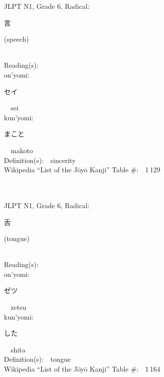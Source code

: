 \begin{multicols}{2}
{JLPT N1, Grade 6, Radical:\ \ {\begin{CJK}{UTF8}{min} 言 \end{CJK}} (speech) } \\
Reading(s):\ \ \\
{\hspace*{1em}}on'yomi:\ \ \\
{\hspace*{2em}}{\begin{CJK}{UTF8}{min} セイ \end{CJK}}\ \ sei\ \ \\
{\hspace*{1em}}kun'yomi:\ \ \\
{\hspace*{2em}}{\begin{CJK}{UTF8}{min} まこと \end{CJK}}\ \ makoto\ \ \\
Definition(s):\ \ sincerity \\
Wikipedia ``List of the J\=oy\=o Kanji'' Table \#:\ \ 1\,129 \\
\ \ \\
{\fontsize{34pt}{40pt}  }\ \ \\  %
{JLPT N1, Grade 6, Radical:\ \ {\begin{CJK}{UTF8}{min} 舌 \end{CJK}} (tongue) } \\
Reading(s):\ \ \\
{\hspace*{1em}}on'yomi:\ \ \\
{\hspace*{2em}}{\begin{CJK}{UTF8}{min} ゼツ \end{CJK}}\ \ zetsu\ \ \\
{\hspace*{1em}}kun'yomi:\ \ \\
{\hspace*{2em}}{\begin{CJK}{UTF8}{min} した \end{CJK}}\ \ shita\ \ \\
Definition(s):\ \ tongue \\
Wikipedia ``List of the J\=oy\=o Kanji'' Table \#:\ \ 1\,164 \\
\ \ \\
{\fontsize{34pt}{40pt}  }\ \ \\  %

\end{multicols}
